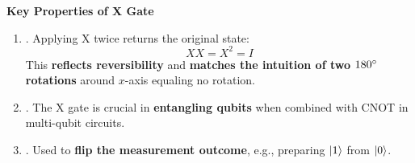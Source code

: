 \highspace
\begin{flushleft}
   \textcolor{Green3}{ \textbf{Key Properties of X Gate}}
\end{flushleft}
\begin{enumerate}
   \item {}. Applying X twice returns the original state:
   \begin{equation*}
      X X = X^{2} = I
   \end{equation*}
   This \textbf{reflects reversibility} and \textbf{matches the intuition of two $180\degree$ rotations} around $x$-axis equaling no rotation.

   \item {}. The X gate is crucial in \textbf{entangling qubits} when combined with CNOT in multi-qubit circuits.
   \item {}. Used to \textbf{flip the measurement outcome}, e.g., preparing $| 1 \rangle$ from $| 0 \rangle$.
\end{enumerate}